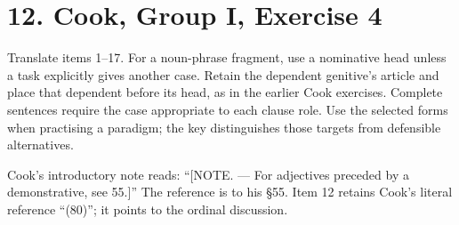 \section*{12. Cook, Group I, Exercise 4}

Translate items 1–17. For a noun-phrase fragment, use a nominative head unless a task explicitly gives another case. Retain the dependent genitive’s article and place that dependent before its head, as in the earlier Cook exercises. Complete sentences require the case appropriate to each clause role. Use the selected forms when practising a paradigm; the key distinguishes those targets from defensible alternatives.

Cook’s introductory note reads: “[NOTE. — For adjectives preceded by a demonstrative, see 55.]” The reference is to his §55. Item 12 retains Cook’s literal reference “(80)”; it points to the ordinal discussion.

\par\begin{minipage}{\linewidth}\raggedright

\end{minipage}\par\addvspace{4pt}

\par\begin{minipage}{\linewidth}\raggedright

\end{minipage}\par\addvspace{4pt}

\par\begin{minipage}{\linewidth}\raggedright

\end{minipage}\par\addvspace{4pt}

\par\begin{minipage}{\linewidth}\raggedright

\end{minipage}\par\addvspace{4pt}


